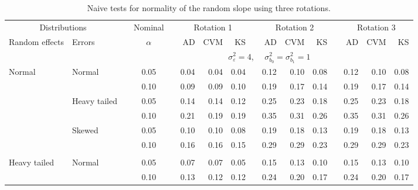 \documentclass{article} %
\begin{document}
\begin{table}[ht]
\begin{scriptsize}
\begin{center}
\begin{tabular}{ll p{.1cm} c p{.1cm} rrr p{.1cm} rrr p{.1cm} rrr}
   \hline
\end{tabular}
\end{center}
\end{scriptsize}
\end{table}



\begin{table}[ht]
\caption{Naive tests for normality of the random slope using three rotations.}
\begin{scriptsize}
\begin{center}
\begin{tabular}{ll p{.1cm} c p{.1cm} rrr p{.1cm} rrr p{.1cm} rrr}
  \hline
  \multicolumn{2}{c}{Distributions}& & Nominal & &  \multicolumn{3}{c}{Rotation 1} & & \multicolumn{3}{c}{Rotation 2} & & \multicolumn{3}{c}{Rotation 3}\\ \cline{1-2} \cline{6-8} \cline{10-12} \cline{14-16}
  Random effects & Errors & & $\alpha$ & & AD & CVM & KS & & AD & CVM & KS & & AD & CVM & KS \\ 
   \hline
& && && \multicolumn{9}{c}{$\sigma_{\varepsilon}^2 = 4$, \ \ $\sigma_{b_0}^2 = \sigma_{b_1}^2 = 1$} \\ \cline{6-16}
\rowcolor{gray!20}Normal       & Normal       && 0.05 &&   0.04 & 0.04 & 0.04 && 0.12 & 0.10 & 0.08 && 0.12 & 0.10 & 0.08 \\ 
\rowcolor{gray!20}             &              && 0.10 &&   0.09 & 0.09 & 0.10 && 0.19 & 0.17 & 0.14 && 0.19 & 0.17 & 0.14 \\ 
\rowcolor{gray!20}             & Heavy tailed && 0.05 &&   0.14 & 0.14 & 0.12 && 0.25 & 0.23 & 0.18 && 0.25 & 0.23 & 0.18 \\ 
\rowcolor{gray!20}             &              && 0.10 &&   0.21 & 0.19 & 0.19 && 0.35 & 0.31 & 0.26 && 0.35 & 0.31 & 0.26 \\ 
\rowcolor{gray!20}             & Skewed       && 0.05 &&   0.10 & 0.10 & 0.08 && 0.19 & 0.18 & 0.13 && 0.19 & 0.18 & 0.13 \\ 
\rowcolor{gray!20}             &              && 0.10 &&   0.16 & 0.16 & 0.15 && 0.29 & 0.29 & 0.23 && 0.29 & 0.29 & 0.23 \\ 
             &&&&&&&&&&&&&&&\\
Heavy tailed & Normal       && 0.05 &&   0.07 & 0.07 & 0.05 && 0.15 & 0.13 & 0.10 && 0.15 & 0.13 & 0.10 \\ 
             &              && 0.10 &&   0.13 & 0.12 & 0.12 && 0.24 & 0.20 & 0.17 && 0.24 & 0.20 & 0.17 \\ 

\end{tabular}
\end{center}
\end{scriptsize}
\end{table}
\end{document}
